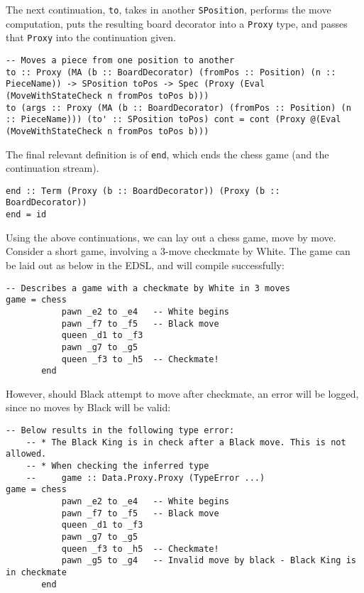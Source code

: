 \documentclass[12pt, a4paper]{scrartcl}
\begin{document}
The next continuation, \lstinline{to}, takes in another \lstinline{SPosition}, performs the move computation, puts the resulting board decorator into a \lstinline{Proxy} type, and passes that \lstinline{Proxy} into the continuation given.

\begin{lstlisting}
-- Moves a piece from one position to another
to :: Proxy (MA (b :: BoardDecorator) (fromPos :: Position) (n :: PieceName)) -> SPosition toPos -> Spec (Proxy (Eval (MoveWithStateCheck n fromPos toPos b)))
to (args :: Proxy (MA (b :: BoardDecorator) (fromPos :: Position) (n :: PieceName))) (to' :: SPosition toPos) cont = cont (Proxy @(Eval (MoveWithStateCheck n fromPos toPos b)))
\end{lstlisting}

The final relevant definition is of \lstinline{end}, which ends the chess game (and the continuation stream).

\begin{lstlisting}
end :: Term (Proxy (b :: BoardDecorator)) (Proxy (b :: BoardDecorator))
end = id
\end{lstlisting}

Using the above continuations, we can lay out a chess game, move by move. Consider a short game, involving a 3-move checkmate by White. The game can be laid out as below in the EDSL, and will compile successfully:

\begin{lstlisting}
-- Describes a game with a checkmate by White in 3 moves
game = chess
           pawn _e2 to _e4   -- White begins
           pawn _f7 to _f5   -- Black move
           queen _d1 to _f3
           pawn _g7 to _g5
           queen _f3 to _h5  -- Checkmate!
       end
\end{lstlisting}

However, should Black attempt to move after checkmate, an error will be logged, since no moves by Black will be valid:

\begin{lstlisting}
-- Below results in the following type error:
    -- * The Black King is in check after a Black move. This is not allowed.
    -- * When checking the inferred type
    --     game :: Data.Proxy.Proxy (TypeError ...)
game = chess
           pawn _e2 to _e4   -- White begins
           pawn _f7 to _f5   -- Black move
           queen _d1 to _f3
           pawn _g7 to _g5
           queen _f3 to _h5  -- Checkmate!
           pawn _g5 to _g4   -- Invalid move by black - Black King is in checkmate
       end
\end{lstlisting}
\end{document}
